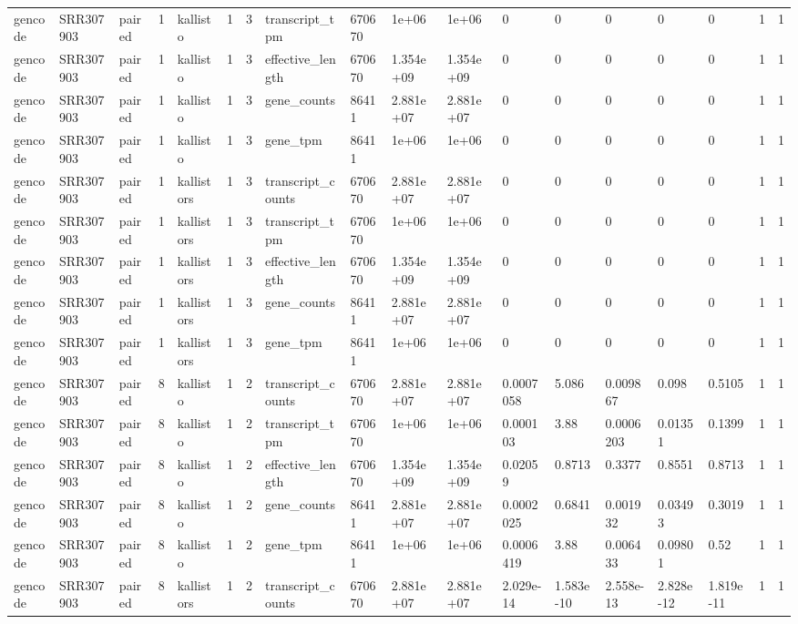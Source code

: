 \begin{tabular}{llllllllllllllllll}
gencode & SRR307903 & paired & 1 & kallisto & 1 & 3 & transcript\_tpm & 670670 & 1e+06 & 1e+06 & 0 & 0 & 0 & 0 & 0 & 1 & 1 \\
gencode & SRR307903 & paired & 1 & kallisto & 1 & 3 & effective\_length & 670670 & 1.354e+09 & 1.354e+09 & 0 & 0 & 0 & 0 & 0 & 1 & 1 \\
gencode & SRR307903 & paired & 1 & kallisto & 1 & 3 & gene\_counts & 86411 & 2.881e+07 & 2.881e+07 & 0 & 0 & 0 & 0 & 0 & 1 & 1 \\
gencode & SRR307903 & paired & 1 & kallisto & 1 & 3 & gene\_tpm & 86411 & 1e+06 & 1e+06 & 0 & 0 & 0 & 0 & 0 & 1 & 1 \\
gencode & SRR307903 & paired & 1 & kallistors & 1 & 3 & transcript\_counts & 670670 & 2.881e+07 & 2.881e+07 & 0 & 0 & 0 & 0 & 0 & 1 & 1 \\
gencode & SRR307903 & paired & 1 & kallistors & 1 & 3 & transcript\_tpm & 670670 & 1e+06 & 1e+06 & 0 & 0 & 0 & 0 & 0 & 1 & 1 \\
gencode & SRR307903 & paired & 1 & kallistors & 1 & 3 & effective\_length & 670670 & 1.354e+09 & 1.354e+09 & 0 & 0 & 0 & 0 & 0 & 1 & 1 \\
gencode & SRR307903 & paired & 1 & kallistors & 1 & 3 & gene\_counts & 86411 & 2.881e+07 & 2.881e+07 & 0 & 0 & 0 & 0 & 0 & 1 & 1 \\
gencode & SRR307903 & paired & 1 & kallistors & 1 & 3 & gene\_tpm & 86411 & 1e+06 & 1e+06 & 0 & 0 & 0 & 0 & 0 & 1 & 1 \\
gencode & SRR307903 & paired & 8 & kallisto & 1 & 2 & transcript\_counts & 670670 & 2.881e+07 & 2.881e+07 & 0.0007058 & 5.086 & 0.009867 & 0.098 & 0.5105 & 1 & 1 \\
gencode & SRR307903 & paired & 8 & kallisto & 1 & 2 & transcript\_tpm & 670670 & 1e+06 & 1e+06 & 0.000103 & 3.88 & 0.0006203 & 0.01351 & 0.1399 & 1 & 1 \\
gencode & SRR307903 & paired & 8 & kallisto & 1 & 2 & effective\_length & 670670 & 1.354e+09 & 1.354e+09 & 0.02059 & 0.8713 & 0.3377 & 0.8551 & 0.8713 & 1 & 1 \\
gencode & SRR307903 & paired & 8 & kallisto & 1 & 2 & gene\_counts & 86411 & 2.881e+07 & 2.881e+07 & 0.0002025 & 0.6841 & 0.001932 & 0.03493 & 0.3019 & 1 & 1 \\
gencode & SRR307903 & paired & 8 & kallisto & 1 & 2 & gene\_tpm & 86411 & 1e+06 & 1e+06 & 0.0006419 & 3.88 & 0.006433 & 0.09801 & 0.52 & 1 & 1 \\
gencode & SRR307903 & paired & 8 & kallistors & 1 & 2 & transcript\_counts & 670670 & 2.881e+07 & 2.881e+07 & 2.029e-14 & 1.583e-10 & 2.558e-13 & 2.828e-12 & 1.819e-11 & 1 & 1 \\

\end{tabular}
